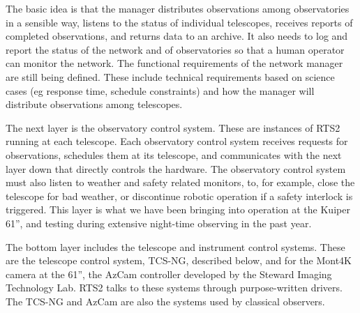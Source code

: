 \documentclass[]{spie}  %
\begin{document}
The basic idea is that the manager distributes observations among observatories in a sensible way, listens to the status of individual telescopes, receives reports of completed observations, and returns data to an archive. It also needs to log and report the status of the network and of observatories so that a human operator can monitor the network. The functional requirements of the network manager are still being defined. These include technical requirements based on science cases (eg response time, schedule constraints) and how the manager will distribute observations among telescopes.

The next layer is the observatory control system. These are instances of RTS2 running at each telescope. Each observatory control system receives requests for observations, schedules them at its telescope, and communicates with the next layer down that directly controls the hardware. The observatory control system must also listen to weather and safety related monitors, to, for example, close the telescope for bad weather, or discontinue robotic operation if a safety interlock is triggered.  This layer is what we have been bringing into operation at the Kuiper 61'', and testing during extensive night-time observing in the past year.

The bottom layer includes the telescope and instrument control systems.  These are the telescope control system, TCS-NG, described below, and for the Mont4K camera at the 61'', the AzCam controller developed by the Steward Imaging Technology Lab. RTS2 talks to these systems through purpose-written drivers. The TCS-NG and AzCam are also the systems used by classical observers.
 
\end{document}
